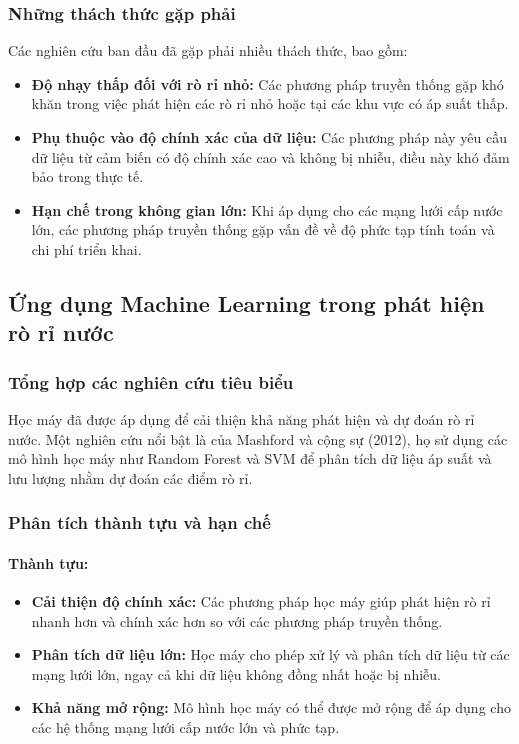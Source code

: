 \subsubsection{Những thách thức gặp phải}
Các nghiên cứu ban đầu đã gặp phải nhiều thách thức, bao gồm:
\begin{itemize}
    \item \textbf{Độ nhạy thấp đối với rò rỉ nhỏ:} Các phương pháp truyền thống gặp khó khăn trong việc phát hiện các rò rỉ nhỏ hoặc tại các khu vực có áp suất thấp.
    \item \textbf{Phụ thuộc vào độ chính xác của dữ liệu:} Các phương pháp này yêu cầu dữ liệu từ cảm biến có độ chính xác cao và không bị nhiễu, điều này khó đảm bảo trong thực tế.
    \item \textbf{Hạn chế trong không gian lớn:} Khi áp dụng cho các mạng lưới cấp nước lớn, các phương pháp truyền thống gặp vấn đề về độ phức tạp tính toán và chi phí triển khai.
\end{itemize}

\subsection{Ứng dụng Machine Learning trong phát hiện rò rỉ nước}
\subsubsection{Tổng hợp các nghiên cứu tiêu biểu}
Học máy đã được áp dụng để cải thiện khả năng phát hiện và dự đoán rò rỉ nước. Một nghiên cứu nổi bật là của Mashford và cộng sự (2012)\cite{Mashford2012}, họ sử dụng các mô hình học máy như Random Forest và SVM để phân tích dữ liệu áp suất và lưu lượng nhằm dự đoán các điểm rò rỉ.

\subsubsection{Phân tích thành tựu và hạn chế}

\paragraph{Thành tựu:}
\begin{itemize}
    \item \textbf{Cải thiện độ chính xác:} Các phương pháp học máy giúp phát hiện rò rỉ nhanh hơn và chính xác hơn so với các phương pháp truyền thống.
    \item \textbf{Phân tích dữ liệu lớn:} Học máy cho phép xử lý và phân tích dữ liệu từ các mạng lưới lớn, ngay cả khi dữ liệu không đồng nhất hoặc bị nhiễu.
    \item \textbf{Khả năng mở rộng:} Mô hình học máy có thể được mở rộng để áp dụng cho các hệ thống mạng lưới cấp nước lớn và phức tạp.
\end{itemize}

